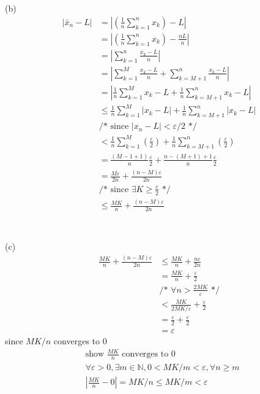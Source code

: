 \documentclass[12pt, border = 4pt, multi]{article} %
\begin{document}
\\
\\
(b)
\begin{align*}
|\bar{x}_n - L| &= \left|\left(\frac{1}{n}\sum_{k = 1} ^ n x_k\right) - L\right|\\
&= \left|\left(\frac{1}{n}\sum_{k = 1} ^ n x_k\right) - \frac{nL}{n}\right|\\
&= \left|\sum_{k = 1} ^ n\frac{x_k - L}{n}\right|\\
&= \left|\sum_{k = 1} ^ M\frac{x_k - L}{n} + \sum_{k = M + 1} ^ n\frac{x_k - L}{n}\right|\\
&= \left|\frac{1}{n}\sum_{k = 1} ^ M x_k - L + \frac{1}{n}\sum_{k = M + 1} ^ n x_k - L\right|\\
&\leq \frac{1}{n}\sum_{k = 1} ^ M |x_k - L| + \frac{1}{n}\sum_{k = M + 1} ^ n |x_k - L|\\
&\text{/* since } |x_n - L| < \varepsilon / 2 \text{ */}\\
&< \frac{1}{n}\sum_{k = 1} ^ M \left(\frac{\varepsilon}{2}\right) + \frac{1}{n}\sum_{k = M + 1} ^ n \left(\frac{\varepsilon}{2}\right)\\
&= \frac{(M - 1 + 1)}{n}\frac{\varepsilon}{2} + \frac{n - (M + 1) + 1}{n}\frac{\varepsilon}{2}\\
&= \frac{M\varepsilon}{2n} + \frac{(n - M)\varepsilon}{2n}\\
&\text{/* since } \exists K \geq \frac{\varepsilon}{2} \text{ */}\\
&\leq \frac{MK}{n} + \frac{(n - M)\varepsilon}{2n}\\
\end{align*}
\\
\\
(c)
\begin{align*}
\frac{MK}{n} + \frac{(n - M)\varepsilon}{2n} &\leq \frac{MK}{n} + \frac{n\varepsilon}{2n}\\
&= \frac{MK}{n} + \frac{\varepsilon}{2}\\
&\text{/* }\forall n > \frac{2MK}{\varepsilon}\text{ */}\\
&< \frac{MK}{2MK / \varepsilon} + \frac{\varepsilon}{2}\\
&= \frac{\varepsilon}{2} + \frac{\varepsilon}{2}\\
&= \varepsilon
\end{align*}
since $MK / n$ converges to 0
\begin{align*}
&\text{show } \frac{MK}{n} \text{ converges to 0}\\
&\forall \varepsilon > 0, \exists m \in \mathbb{N}, 0 < MK / m < \varepsilon, \forall n \geq m\\
&\left|\frac{MK}{n} - 0\right| = MK / n \leq MK / m < \varepsilon
\end{align*}
\end{document}
